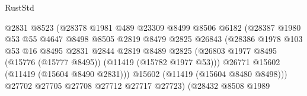\begin{lexlean}{RustStd}
\begin{coremodule}
                                        @2831
                                        @8523
                                        (@28378
                                          @1981
                                          @489
                                          @23309
                                          @8499
                                          @8506
                                          @6182
                                          (@28387
                                            @1980
                                            @53
                                            @55
                                            @4647
                                            @8498
                                            @8505
                                            @2819
                                            @8479
                                            @2825
                                            @26843
                                            (@28386
                                              @1978
                                              @103
                                              @53
                                              @16
                                              @8495
                                              @2831
                                              @2844
                                              @2819
                                              @8489
                                              @2825
                                              (@26803
                                                @1977
                                                @8495
                                                (@15776 (@15777 @8495))
                                                (@11419 (@15782 @1977 @53)))
                                              @26771
                                              @15602
                                              (@11419 (@15604 @8490 @2831)))
                                            @15602
                                            (@11419 (@15604 @8480 @8498)))
                                          @27702
                                          @27705
                                          @27708
                                          @27712
                                          @27717
                                          @27723)
                                        (@28432
                                          @8508
                                          @1989

\end{coremodule}
\end{lexlean}
